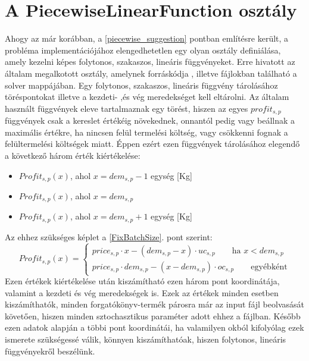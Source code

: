 \section{A PiecewiseLinearFunction osztály} \label{piecewise_class}
Ahogy az már korábban, a \ref{piecewise_suggestion} pontban említésre került, a probléma implementációjához elengedhetetlen egy olyan osztály definiálása, amely kezelni képes folytonos, szakaszos, lineáris függvényeket.
Erre hivatott az általam megalkotott  osztály, amelynek forráskódja , illetve  fájlokban található a solver  mappájában.
Egy folytonos, szakaszos, lineáris függvény tárolásához töréspontokat illetve a kezdeti- ,és vég meredekséget kell eltárolni.
Az általam használt függvények eleve tartalmaznak egy törést, hiszen az egyes $profit_{s,p}$ függvények csak a kereslet értékéig növekednek, onnantól pedig vagy beállnak a maximális értékre, ha nincsen felül termelési költség, vagy csökkenni fognak a felültermelési költségek miatt.
Éppen ezért ezen függvények tárolásához elegendő a következő három érték kiértékelése:
\begin{itemize}
\item $Profit_{s,p}(x)$\quad, ahol $x=dem_{s,p}-1$ egység [Kg]
\item $Profit_{s,p}(x)$\quad, ahol $x=dem_{s,p}$
\item $Profit_{s,p}(x)$\quad, ahol $x=dem_{s,p}+1$ egység [Kg]
\end{itemize}
Az ehhez szükséges képlet a \ref{FixBatchSize}. pont szerint:
\begin{equation*}
Profit_{s,p}(x)= \begin{cases}
            price_{s,p}\cdot x-(dem_{s,p}-x) \cdot uc_{s,p}\qquad \text{ha } x<dem_{s,p} \\
            price_{s,p} \cdot dem_{s,p}-(x-dem_{s,p}) \cdot oc_{s,p}\qquad \text{egyébként}
       \end{cases}
\end{equation*}
Ezen értékek kiértékelése után kiszámítható ezen három pont koordinátája, valamint a kezdeti és vég meredekségek is.
Ezek az értékek minden esetben kiszámíthatók, minden forgatókönyv-termék párosra már az input fájl beolvasását követően, hiszen minden sztochasztikus paraméter adott ehhez a fájlban.
Később ezen adatok alapján a többi pont koordinátái, ha valamilyen okból kifolyólag ezek ismerete szükségessé válik, könnyen kiszámíthatóak, hiszen folytonos, lineáris függvényekről beszélünk.
